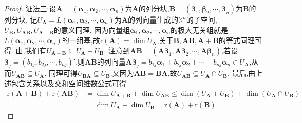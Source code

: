 \documentclass[../../main.tex]{subfiles}
\begin{document}
\begin{proof}
{\color{blue}证法三:}设\(\boldsymbol{A}=(\boldsymbol{\alpha}_1,\boldsymbol{\alpha}_2,\cdots,\boldsymbol{\alpha}_n)\)为\(\boldsymbol{A}\)的列分块,\(\boldsymbol{B}=(\boldsymbol{\beta}_1,\boldsymbol{\beta}_2,\cdots,\boldsymbol{\beta}_n)\)为\(\boldsymbol{B}\)的列分块. 记\(U_{\boldsymbol{A}} = L(\boldsymbol{\alpha}_1,\boldsymbol{\alpha}_2,\cdots,\boldsymbol{\alpha}_n)\)为\(\boldsymbol{A}\)的列向量生成的\(\mathbb{K}^n\)的子空间,\(U_{\boldsymbol{B}},U_{\boldsymbol{A}\boldsymbol{B}},U_{\boldsymbol{A}+\boldsymbol{B}}\)的意义同理. 因为向量组\(\boldsymbol{\alpha}_1,\boldsymbol{\alpha}_2,\cdots,\boldsymbol{\alpha}_n\)的极大无关组就是\(L(\boldsymbol{\alpha}_1,\boldsymbol{\alpha}_2,\cdots,\boldsymbol{\alpha}_n)\)的一组基,故\(\mathrm{r}(\boldsymbol{A})=\dim U_{\boldsymbol{A}}\),关于\(\boldsymbol{B},\boldsymbol{A}\boldsymbol{B},\boldsymbol{A}+\boldsymbol{B}\)的等式同理可得. 由,我们有\(U_{\boldsymbol{A}+\boldsymbol{B}}\subseteq U_{\boldsymbol{A}}+U_{\boldsymbol{B}}\). 注意到\(\boldsymbol{A}\boldsymbol{B}=(\boldsymbol{A}\boldsymbol{\beta}_1,\boldsymbol{A}\boldsymbol{\beta}_2,\cdots,\boldsymbol{A}\boldsymbol{\beta}_n)\),若设\(\boldsymbol{\beta}_j=(b_{1j},b_{2j},\cdots,b_{nj})'\),则\(\boldsymbol{A}\boldsymbol{B}\)的列向量\(\boldsymbol{A}\boldsymbol{\beta}_j=b_{1j}\boldsymbol{\alpha}_1 + b_{2j}\boldsymbol{\alpha}_2+\cdots + b_{nj}\boldsymbol{\alpha}_n\in U_{\boldsymbol{A}}\),从而\(U_{\boldsymbol{A}\boldsymbol{B}}\subseteq U_{\boldsymbol{A}}\). 同理可得\(U_{\boldsymbol{B}\boldsymbol{A}}\subseteq U_{\boldsymbol{B}}\).又因为\(\boldsymbol{A}\boldsymbol{B}=\boldsymbol{B}\boldsymbol{A}\),故\(U_{\boldsymbol{A}\boldsymbol{B}}\subseteq U_{\boldsymbol{A}}\cap U_{\boldsymbol{B}}\). 最后,由上述包含关系以及交和空间维数公式可得
\begin{align*}
\mathrm{r}(\boldsymbol{A}+\boldsymbol{B})+\mathrm{r}(\boldsymbol{A}\boldsymbol{B})&=\dim U_{\boldsymbol{A}+\boldsymbol{B}}+\dim U_{\boldsymbol{A}\boldsymbol{B}}\leqslant \dim(U_{\boldsymbol{A}}+U_{\boldsymbol{B}})+\dim(U_{\boldsymbol{A}}\cap U_{\boldsymbol{B}})\\
&=\dim U_{\boldsymbol{A}}+\dim U_{\boldsymbol{B}}=\mathrm{r}(\boldsymbol{A})+\mathrm{r}(\boldsymbol{B}).
\end{align*}
\end{proof}
\end{document}

